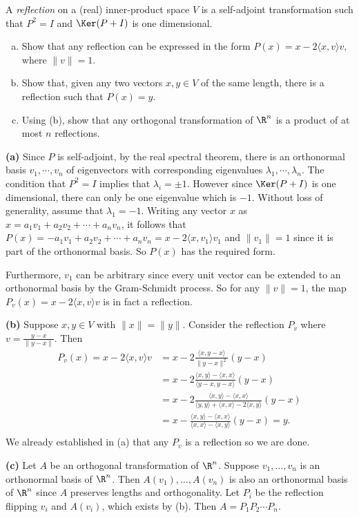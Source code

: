 \begin{problem}
A \emph{reflection} on a (real) inner-product space $V$ is a self-adjoint transformation such that $P^2 = I$ and $\Ker(P+I)$ is one dimensional.

\begin{enumerate}[(a)]
  \item Show that any reflection can be expressed in the form $P(x) = x - 2\langle x,v\rangle v$, where $\|v\|=1$.
  \item Show that, given any two vectors $x,y \in V$ of the same length, there is a reflection such that $P(x)=y$. 
  \item Using (b), show that any orthogonal transformation of $\R^n$ is a product of at most $n$ reflections. 
\end{enumerate}
\end{problem}

\textbf{(a)} Since $P$ is self-adjoint, by the real spectral theorem, there is an orthonormal basis $v_1,\cdots,v_n$ of eigenvectors with corresponding eigenvalues $\lambda_1,\cdots,\lambda_n$. The condition that $P^2=I$ implies that $\lambda_i=\pm 1$. However since $\Ker(P+I)$ is one dimensional, there can only be one eigenvalue which is $-1$. Without loss of generality, assume that $\lambda_1=-1$. Writing any vector $x$ as $x=a_1v_1+a_2v_2+\cdots+a_nv_n$, it follows that $P(x)=-a_1v_1+a_2v_2+\cdots+a_nv_n=x-2\langle x, v_1\rangle v_1$ and $\|v_1\|=1$ since it is part of the orthonormal basis. So $P(x)$ has the required form.

Furthermore, $v_1$ can be arbitrary since every unit vector can be extended to an orthonormal basis by the Gram-Schmidt process. So for any $\|v\|=1$, the map $P_v(x)=x-2\langle x, v\rangle v$ is in fact a reflection.

\textbf{(b)} Suppose $x,y\in V$ with $\|x\|=\|y\|$. Consider the reflection $P_v$ where $v = \frac{y-x}{\|y-x\|}$. Then
\[
  \begin{aligned}
    P_v(x)=x-{2\langle x, v\rangle}v&=x-2\frac{\langle x, y-x\rangle}{\|y-x\|^2}(y-x)\\
    &=x-2\frac{\langle x, y\rangle - \langle x, x\rangle}{\langle y-x, y-x\rangle}(y-x)\\
    &=x-2\frac{\langle x, y\rangle - \langle x, x\rangle}{\langle y, y\rangle+\langle x, x\rangle-2\langle x, y\rangle}(y-x)\\
    &=x-\frac{\langle x, y\rangle - \langle x, x\rangle}{\langle x, x\rangle-\langle x, y\rangle}(y-x)=y.\\
  \end{aligned}
\]
We already established in (a) that any $P_v$ is a reflection so we are done.

\textbf{(c)} Let $A$ be an orthogonal transformation of $\R^n$. Suppose $v_1, \ldots, v_n$ is an orthonormal basis of $\R^n$. Then $A(v_1), \ldots, A(v_n)$ is also an orthonormal basis of $\R^n$ since $A$ preserves lengths and orthogonality. Let $P_i$ be the reflection flipping $v_i$ and $A(v_i)$, which exists by (b). Then $A=P_1P_2\cdots P_n$. 